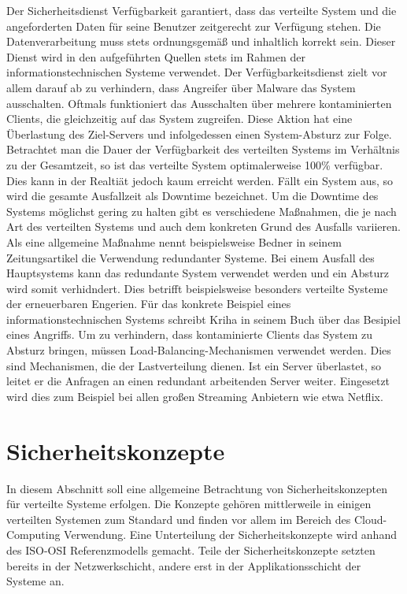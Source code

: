 \documentclass[utf8,biblatex]{lni}
\begin{document}
Der Sicherheitsdienst Verfügbarkeit garantiert, dass das verteilte System und die angeforderten Daten für seine Benutzer zeitgerecht zur Verfügung stehen. Die Datenverarbeitung muss stets ordnungsgemäß
und inhaltlich korrekt sein. \citet{Bedner.2010}
Dieser Dienst wird in den aufgeführten Quellen stets im Rahmen der informationstechnischen Systeme verwendet. Der Verfügbarkeitsdienst
  zielt vor allem darauf ab zu verhindern, 
dass Angreifer über Malware das System ausschalten. Oftmals funktioniert das Ausschalten über mehrere kontaminierten Clients, die gleichzeitig auf das System zugreifen. 
Diese Aktion hat eine Überlastung des Ziel-Servers und infolgedessen einen System-Absturz zur Folge. \citet{Kriha.2008}
\newline
Betrachtet man die Dauer der Verfügbarkeit des verteilten Systems im Verhältnis zu der Gesamtzeit, so ist das verteilte System optimalerweise 100\% verfügbar. Dies kann in der Realtiät jedoch kaum erreicht werden.
Fällt ein System aus, so wird die gesamte Ausfallzeit als Downtime bezeichnet. \citet{Bedner.2010}
\newline
 Um die Downtime des Systems möglichst gering zu halten gibt es verschiedene Maßnahmen, die je nach Art des verteilten Systems und auch
dem konkreten Grund des Ausfalls variieren. Als eine allgemeine Maßnahme nennt beispielsweise Bedner in seinem Zeitungsartikel \citet{Bedner.2010} die Verwendung redundanter Systeme. Bei einem Ausfall
des Hauptsystems kann das redundante System verwendet werden und ein Absturz wird somit verhidndert. Dies betrifft beispielsweise besonders verteilte Systeme der erneuerbaren Engerien.
Für das konkrete Beispiel eines informationstechnischen Systems schreibt Kriha in seinem Buch \citet{Kriha.2008} über das Besipiel eines Angriffs. Um zu verhindern, dass kontaminierte Clients das System zu Absturz
bringen, müssen Load-Balancing-Mechanismen verwendet werden. Dies sind Mechanismen, die der Lastverteilung dienen. Ist ein Server überlastet, so leitet er die Anfragen an einen redundant arbeitenden Server weiter.
Eingesetzt wird dies zum Beispiel bei allen großen Streaming Anbietern wie etwa Netflix.

\section{Sicherheitskonzepte}

In diesem Abschnitt soll eine allgemeine Betrachtung von Sicherheitskonzepten 
für verteilte Systeme erfolgen. 
Die Konzepte gehören mittlerweile in einigen verteilten Systemen zum Standard und finden vor allem im Bereich des Cloud-Computing Verwendung.
Eine Unterteilung der Sicherheitskonzepte wird anhand des ISO-OSI Referenzmodells gemacht. 
Teile der Sicherheitskonzepte setzten bereits in der Netzwerkschicht, andere erst in der 
Applikationsschicht der Systeme an. 
\end{document}
